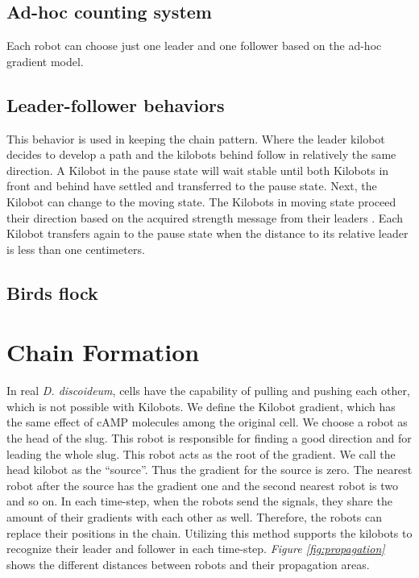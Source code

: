 \documentclass[11pt,a4paper]{article}
\begin{document}
\subsection{Ad-hoc counting system}
Each robot can choose just one leader and one follower based on the ad-hoc gradient model. 
\subsection{Leader-follower behaviors} This behavior is used in keeping the chain pattern. Where the leader kilobot decides to develop a path and the kilobots behind follow in relatively the same direction. A Kilobot in the pause state will wait stable until both Kilobots in front and behind have settled and transferred to the pause state. Next, the Kilobot can change to the moving state.
The Kilobots in moving state proceed their direction based on the acquired strength message from their leaders \cite{Beckerleg2016EvolvingRobot}. Each Kilobot transfers again to the pause state when the distance to its relative leader is less than one centimeters. 
\subsection{Birds flock}

\section {Chain Formation} 
In real \textit{D. discoideum}, cells have the capability of pulling and pushing each other, which is not possible with Kilobots. We define the Kilobot gradient, which has the same effect of cAMP molecules among the original cell. We choose a robot as the head of the slug. This robot is responsible for finding a good direction and for leading the whole slug. This robot acts as the root of the gradient. We call the head kilobot as the ``source''. Thus the gradient for the source is zero. The nearest robot after the source has the gradient one and the second nearest robot is two and so on. In each time-step, when the robots send the signals, they share the amount of their gradients with each other as well. Therefore, the robots can replace their positions in the chain. Utilizing this method supports the kilobots to recognize their leader and follower in each time-step. \textit{Figure \ref{fig:propagation}} shows the different distances between robots and their propagation areas. 
\end{document}

